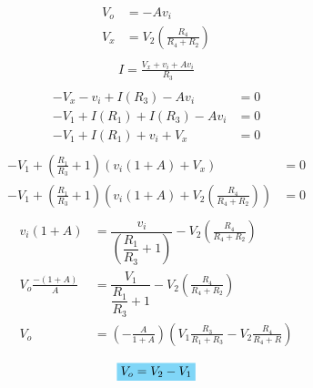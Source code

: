\begin{align*}
V_o &= -Av_i \\
V_x &= V_2\left(\frac{R_4}{R_4+R_2}\right) \\
\end{align*}
\begin{align*}
I = \frac{V_x+v_i+Av_i}{R_3} \\
\end{align*}
\begin{align*}
-V_x -v_i +I(R_3) -Av_i &= 0\\
-V_1 +I(R_1) +I(R_3) -Av_i &= 0\\
-V_1 +I(R_1) +v_i +V_x &= 0\\
\end{align*}
\begin{align*}
-V_1 +\left(\frac{R_1}{R_3}+1\right)\left(v_i(1+A) +V_x\right) &= 0\\
-V_1 +\left(\frac{R_1}{R_3}+1\right)\left(v_i(1+A) +V_2\left(\frac{R_4}{R_4+R_2}\right)\right) &= 0\\
\end{align*}
\begin{align*}
v_i(1+A) &= \dfrac{v_i}{\left(\dfrac{R_1}{R_3}+1\right)} -V_2\left(\frac{R_4}{R_4+R_2}\right)\\
V_o\frac{-(1+A)}{A} &= \dfrac{V_1}{\dfrac{R_1}{R_3} +1} -V_2\left(\frac{R_4}{R_4+R_2}\right)\\
V_o &= \left(-\frac{A}{1+A}\right) \left(V_1\frac{R_3}{R_1+R_3} -V_2\frac{R_4}{R_4+R}\right)\\
\end{align*}
\begin{gather*}
	\hlbox{$V_o = V_2-V_1$}
\end{gather*}